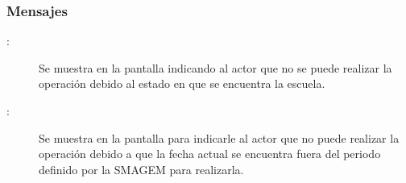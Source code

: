 \subsubsection{Mensajes}

    \begin{description}
	\item[:] Se muestra en la pantalla  indicando al actor que no se puede realizar la operación debido al estado en que se encuentra la escuela.
	
	\item [:] Se muestra en la pantalla  para indicarle al actor que no puede realizar la operación debido a que la fecha actual se encuentra fuera del periodo definido por la SMAGEM para realizarla.
\end{description}
